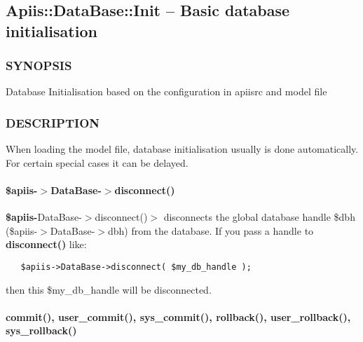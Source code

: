 \subsection{Apiis::DataBase::Init -- Basic database initialisation\label{Apiis::DataBase::Init_--_Basic_database_initialisation}}




\subsubsection*{SYNOPSIS\label{Apiis::DataBase::Init_--_Basic_database_initialisation_SYNOPSIS}}


Database Initialisation based on the configuration in apiisrc and model file

\subsubsection*{DESCRIPTION\label{Apiis::DataBase::Init_--_Basic_database_initialisation_DESCRIPTION}}


When loading the model file, database initialisation usually is done
automatically. For certain special cases it can be delayed.

\paragraph*{\$apiis-$>$DataBase-$>$disconnect()\label{Apiis::DataBase::Init_--_Basic_database_initialisation__apiis-_DataBase-_disconnect_}}


\textbf{\$apiis-}DataBase-$>$disconnect()$>$ disconnects the global database handle
\$dbh (\$apiis-$>$DataBase-$>$dbh) from the database. If you pass a handle to
\textbf{disconnect()} like:

\begin{verbatim}
   $apiis->DataBase->disconnect( $my_db_handle );
\end{verbatim}


then this \$my\_db\_handle will be disconnected.

\paragraph*{commit(), user\_commit(), sys\_commit(), rollback(), user\_rollback(), sys\_rollback()\label{Apiis::DataBase::Init_--_Basic_database_initialisation_commit_user_commit_sys_commit_rollback_user_rollback_sys_rollback_}}



